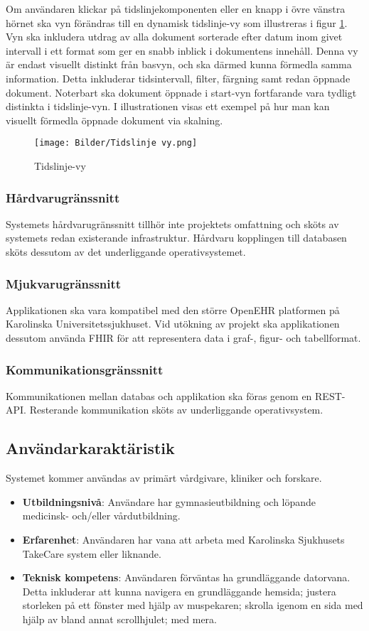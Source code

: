 \documentclass{article}
\begin{document}
\noindent
Om användaren klickar på tidslinjekomponenten eller en knapp i övre vänstra hörnet ska vyn förändras till en dynamisk tidslinje-vy som illustreras i figur \ref{fig:tidslinjevy}. Vyn ska inkludera utdrag av alla dokument sorterade efter datum inom givet intervall i ett format som ger en snabb inblick i dokumentens innehåll. Denna vy är endast visuellt distinkt från basvyn, och ska därmed kunna förmedla samma information. Detta inkluderar tidsintervall, filter, färgning samt redan öppnade dokument. Noterbart ska dokument öppnade i start-vyn fortfarande vara tydligt distinkta i tidslinje-vyn. I illustrationen visas ett exempel på hur man kan visuellt förmedla öppnade dokument via skalning. 
\begin{figure}[H]
    \centering
    \texttt{[image: Bilder/Tidslinje vy.png]}
    \caption{Tidslinje-vy}
    \label{fig:tidslinjevy}
\end{figure}

\subsubsection{Hårdvarugränssnitt}
Systemets hårdvarugränssnitt tillhör inte projektets omfattning och sköts av systemets redan existerande infrastruktur. Hårdvaru kopplingen till databasen sköts dessutom av det underliggande operativsystemet. 

\subsubsection{Mjukvarugränssnitt}
Applikationen ska vara kompatibel med den större OpenEHR platformen på Karolinska Universitetssjukhuset. Vid utökning av projekt ska applikationen dessutom använda FHIR för att representera data i graf-, figur- och tabellformat. 

\subsubsection{Kommunikationsgränssnitt}
Kommunikationen mellan databas och applikation ska föras genom en REST-API. Resterande kommunikation sköts av underliggande operativsystem. 
\newpage
\subsection{Användarkaraktäristik}
Systemet kommer användas av primärt vårdgivare, kliniker och forskare. 
\begin{itemize}
    \item \textbf{Utbildningsnivå}: Användare har gymnasieutbildning och löpande medicinsk- och/eller vårdutbildning. 
    \item \textbf{Erfarenhet}: Användaren har vana att arbeta med Karolinska Sjukhusets TakeCare system eller liknande. 
    \item \textbf{Teknisk kompetens}: Användaren förväntas ha grundläggande datorvana. Detta inkluderar att kunna navigera en grundläggande hemsida; justera storleken på ett fönster med hjälp av muspekaren; skrolla igenom en sida med hjälp av bland annat scrollhjulet; med mera. 
\end{itemize}
\end{document}
